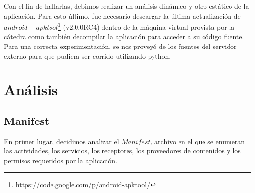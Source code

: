 \documentclass[10pt, a4paper]{article}
\begin{document}
Con el fin de hallarlas, debimos realizar un análisis dinámico y otro estático de la aplicación. Para esto último, fue necesario descargar la última actualización de $android-apktool$\footnote{https://code.google.com/p/android-apktool/} (v2.0.0RC4) dentro de la máquina virtual provista por la cátedra como también decompilar la aplicación para acceder a su código fuente.
Para una correcta experimentación, se nos proveyó de los fuentes del servidor externo para que pudiera ser corrido utilizando python.

\newpage
\section{Análisis}

\subsection{Manifest}

En primer lugar, decidimos analizar el $Manifest$, archivo en el que se enumeran las actividades, los servicios, los receptores, los proveedores de contenidos y los permisos requeridos por la aplicación. 
\end{document}
